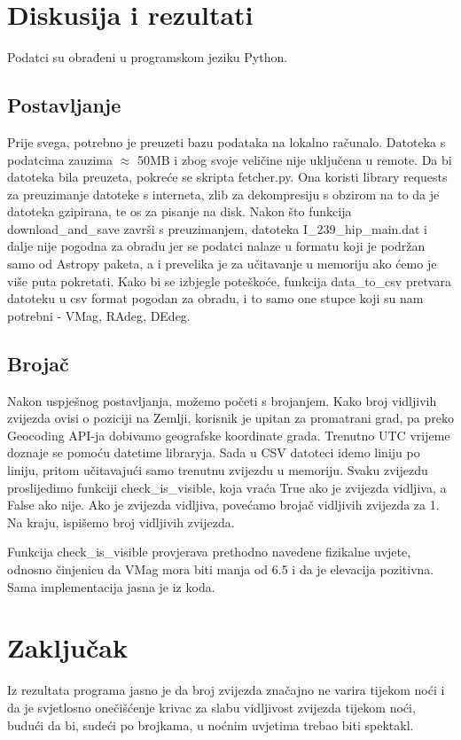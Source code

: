 \documentclass[a4paper,12pt]{article}
\begin{document}
\section{Diskusija i rezultati}
Podatci su obrađeni u programskom jeziku Python.

\subsection{Postavljanje}
Prije svega, potrebno je preuzeti bazu podataka na lokalno računalo. Datoteka s podatcima zauzima $\approx$ 50MB i zbog svoje veličine nije uključena u remote.
Da bi datoteka bila preuzeta, pokreće se skripta fetcher.py. Ona koristi library requests za preuzimanje datoteke s interneta, zlib za dekompresiju s obzirom na to da je datoteka gzipirana, te os za pisanje na disk. Nakon što funkcija download\_and\_save završi s preuzimanjem, datoteka I\_239\_hip\_main.dat i dalje nije pogodna za obradu jer se podatci nalaze u formatu koji je podržan samo od Astropy paketa, a i prevelika je za učitavanje u memoriju ako ćemo je više puta pokretati. Kako bi se izbjegle poteškoće, funkcija data\_to\_csv pretvara datoteku u csv format pogodan za obradu, i to samo one stupce koji su nam potrebni - VMag, RAdeg, DEdeg.

\subsection{Brojač}
Nakon uspješnog postavljanja, možemo početi s brojanjem.
Kako broj vidljivih zvijezda ovisi o poziciji na Zemlji, korisnik je upitan za promatrani grad, pa preko Geocoding API-ja dobivamo geografske koordinate grada. Trenutno UTC vrijeme doznaje se pomoću datetime libraryja.
Sada u CSV datoteci idemo liniju po liniju, pritom učitavajući samo trenutnu zvijezdu u memoriju. Svaku zvijezdu proslijedimo funkciji check\_is\_visible, koja vraća True ako je zvijezda vidljiva, a False ako nije. Ako je zvijezda vidljiva, povećamo brojač vidljivih zvijezda za 1. Na kraju, ispišemo broj vidljivih zvijezda.

Funkcija check\_is\_visible provjerava prethodno navedene fizikalne uvjete, odnosno činjenicu da VMag mora biti manja od 6.5 i da je elevacija pozitivna. Sama implementacija jasna je iz koda.

\section{Zaključak}
Iz rezultata programa jasno je da broj zvijezda značajno ne varira tijekom noći i da je svjetlosno onečišćenje krivac za slabu vidljivost zvijezda tijekom noći, budući da bi, sudeći po brojkama, u noćnim uvjetima trebao biti spektakl.
\end{document}
